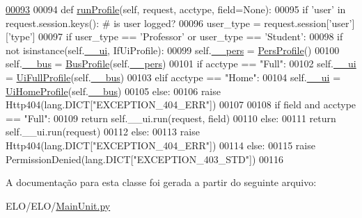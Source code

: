\begin{DoxyCode}
\hypertarget{classELO_1_1MainUnit_1_1Factory_l00093}{}\hyperlink{classELO_1_1MainUnit_1_1Factory_ab20a76f74180fc77c6b8fcd8de7942f1}{00093} 
00094     \textcolor{keyword}{def }\hyperlink{classELO_1_1MainUnit_1_1Factory_ab20a76f74180fc77c6b8fcd8de7942f1}{runProfile}(self, request, acctype, field=None):
00095         \textcolor{keywordflow}{if} \textcolor{stringliteral}{'user'} \textcolor{keywordflow}{in} request.session.keys(): \textcolor{comment}{# is user logged?}
00096             user\_type = request.session[\textcolor{stringliteral}{'user'}][\textcolor{stringliteral}{'type'}]
00097             \textcolor{keywordflow}{if} user\_type == \textcolor{stringliteral}{'Professor'} \textcolor{keywordflow}{or} user\_type == \textcolor{stringliteral}{'Student'}:
00098                 \textcolor{keywordflow}{if} \textcolor{keywordflow}{not} isinstance(self.\hyperlink{classELO_1_1MainUnit_1_1Factory_a189a44a11e1a66ba69663eb2c598dd7c}{\_\_ui}, IfUiProfile):
00099                     self.\hyperlink{classELO_1_1MainUnit_1_1Factory_a68f6640ad3b515e1b8cd48d1554c0779}{\_\_pers} = \hyperlink{classProfile_1_1ProfileUnit_1_1PersProfile}{PersProfile}()
00100                     self.\hyperlink{classELO_1_1MainUnit_1_1Factory_a6a0b7b93046e095779ba54e0a8a4d02c}{\_\_bus} = \hyperlink{classProfile_1_1ProfileUnit_1_1BusProfile}{BusProfile}(self.\hyperlink{classELO_1_1MainUnit_1_1Factory_a68f6640ad3b515e1b8cd48d1554c0779}{\_\_pers})
00101                 \textcolor{keywordflow}{if} acctype == \textcolor{stringliteral}{"Full"}:
00102                     self.\hyperlink{classELO_1_1MainUnit_1_1Factory_a189a44a11e1a66ba69663eb2c598dd7c}{\_\_ui} = \hyperlink{classProfile_1_1ProfileUnit_1_1UiFullProfile}{UiFullProfile}(self.\hyperlink{classELO_1_1MainUnit_1_1Factory_a6a0b7b93046e095779ba54e0a8a4d02c}{\_\_bus})
00103                 \textcolor{keywordflow}{elif} acctype == \textcolor{stringliteral}{"Home"}:
00104                     self.\hyperlink{classELO_1_1MainUnit_1_1Factory_a189a44a11e1a66ba69663eb2c598dd7c}{\_\_ui} = \hyperlink{classProfile_1_1ProfileUnit_1_1UiHomeProfile}{UiHomeProfile}(self.\hyperlink{classELO_1_1MainUnit_1_1Factory_a6a0b7b93046e095779ba54e0a8a4d02c}{\_\_bus})
00105                 \textcolor{keywordflow}{else}:
00106                     \textcolor{keywordflow}{raise} Http404(lang.DICT[\textcolor{stringliteral}{"EXCEPTION\_404\_ERR"}])
00107             
00108                 \textcolor{keywordflow}{if} field \textcolor{keywordflow}{and} acctype == \textcolor{stringliteral}{"Full"}:
00109                     \textcolor{keywordflow}{return} self.\_\_ui.run(request, field)
00110                 \textcolor{keywordflow}{else}:
00111                     \textcolor{keywordflow}{return} self.\_\_ui.run(request)
00112             \textcolor{keywordflow}{else}:
00113                 \textcolor{keywordflow}{raise} Http404(lang.DICT[\textcolor{stringliteral}{"EXCEPTION\_404\_ERR"}])
00114         \textcolor{keywordflow}{else}:
00115             \textcolor{keywordflow}{raise} PermissionDenied(lang.DICT[\textcolor{stringliteral}{"EXCEPTION\_403\_STD"}])
00116         

\end{DoxyCode}


A documentação para esta classe foi gerada a partir do seguinte arquivo\-:\begin{DoxyCompactItemize}
\item 
E\-L\-O/\-E\-L\-O/\hyperlink{MainUnit_8py}{Main\-Unit.\-py}\end{DoxyCompactItemize}
